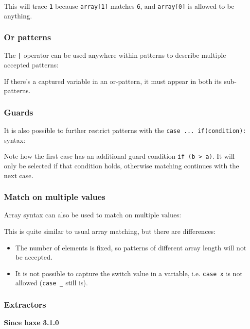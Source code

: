 \documentclass{article}
\newcommand{\expr}[1]{\texttt{#1}}
\newcommand{\since}[1]{\noindent\textbf{Since haxe #1}\\}
\newcommand{\haxe}[2][]{%
}
\begin{document}
This will trace \expr{1} because \expr{array[1]} matches \expr{6}, and \expr{array[0]} is allowed to be anything.

\subsubsection{Or patterns}

The \expr{|} operator can be used anywhere within patterns to describe multiple accepted patterns:

\haxe[firstline=56,lastline=61]{assets/PatternMatching.hx}

If there's a captured variable in an or-pattern, it must appear in both its sub-patterns.

\subsubsection{Guards}
\label{Guards}

It is also possible to further restrict patterns with the \expr{case ... if(condition):} syntax:

\haxe[firstline=64,lastline=72]{assets/PatternMatching.hx}

Note how the first case has an additional guard condition \expr{if (b > a)}. It will only be selected if that condition holds, otherwise matching continues with the next case.

\subsubsection{Match on multiple values}

Array syntax can also be used to match on multiple values:

\haxe[firstline=75,lastline=80]{assets/PatternMatching.hx}

This is quite similar to usual array matching, but there are differences:

\begin{itemize}
	\item The number of elements is fixed, so patterns of different array length will not be accepted.
	\item It is not possible to capture the switch value in a variable, i.e. \expr{case x} is not allowed (\expr{case _} still is).
\end{itemize}




\subsubsection{Extractors}
\since{3.1.0}
\end{document}
